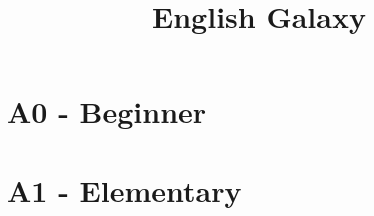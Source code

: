 \documentclass[12pt]{extarticle}
\title{English Galaxy}
\author{}
\date{}
\begin{document}
\maketitle
\tableofcontents
\newpage

\section{A0 - Beginner}



















































\section{A1 - Elementary}





\end{document}
